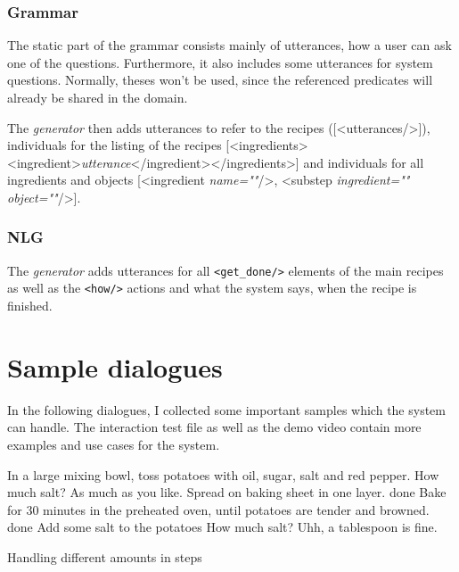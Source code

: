 \documentclass[
	11pt, %
]{fphw}
\newenvironment{captionedDialogue}
    {\captionsetup{
        type=Dialogue,
        skip=2pt,
        belowskip=13pt
        }
    }
    {}
\newenvironment{mydialogue}
    {\begin{snugshade}
     \hrulefill
     \begin{dialogue}}
    {\end{dialogue}
     \hrulefill
     \end{snugshade}}
\begin{document}
\subsubsection*{Grammar}
The static part of the grammar consists mainly of utterances, how a user can ask one of the questions. Furthermore, it also includes some utterances for system questions. Normally, theses won't be used, since the referenced predicates will already be shared in the domain.

The \emph{generator} then adds utterances to refer to the recipes ([<utterances/>]), individuals for the listing of the recipes [<ingredients><ingredient>\emph{utterance}</ingredient></ingredients>] and individuals for all ingredients and objects [<ingredient \emph{name=""}/>, <substep \emph{ingredient=""} \emph{object=""}/>].

\subsubsection*{NLG}
The \emph{generator} adds utterances for all \texttt{<get_done/>} elements of the main recipes as well as the \texttt{<how/>} actions and what the system says, when the recipe is finished.

\section*{Sample dialogues}
In the following dialogues, I collected some important samples which the system can handle. The interaction test file as well as the demo video contain more examples and use cases for the system.

\begin{captionedDialogue}
    \begin{mydialogue}
         In a large mixing bowl, toss potatoes with oil, sugar, salt and red pepper.
         How much salt?
         As much as you like. Spread on baking sheet in one layer.
         done
         Bake for 30 minutes in the preheated oven, until potatoes are tender and browned.
         done
         Add some salt to the potatoes
         How much salt?
         Uhh, a tablespoon is fine.
    \end{mydialogue}
    \caption{Handling different amounts in steps}
    \label{dia:different_amounts}
\end{captionedDialogue}
\end{document}
